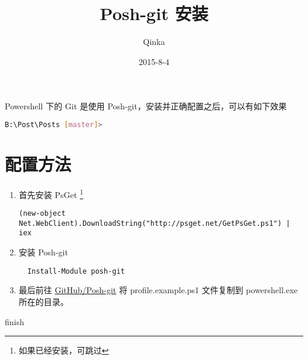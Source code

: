 \documentclass[UTF8]{ctexart}
\title{Posh-git 安装}
\author{Qinka}
\date{2015-8-4}
\begin{document}
\maketitle

Powershell 下的 Git 是使用 Posh-git，安装并正确配置之后，可以有如下效果

\begin{lstlisting}[language=bash]
    B:\Post\Posts [master]>
\end{lstlisting}

\section*{配置方法}
\begin{enumerate}
  \item 首先安装 PsGet \footnote{如果已经安装，可跳过}
  \begin{lstlisting}
(new-object Net.WebClient).DownloadString("http://psget.net/GetPsGet.ps1") | iex
  \end{lstlisting}
  \item 安装 Posh-git
  \begin{lstlisting}
  Install-Module posh-git
  \end{lstlisting}
  \item 最后前往 \href{https://github.com/dahlbyk/posh-git}{GitHub/Posh-git} 将 profile.example.ps1 文件复制到 powershell.exe 所在的目录。
\end{enumerate}

finish
\end{document}
